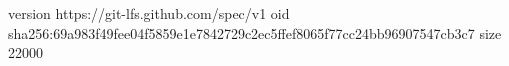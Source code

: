 version https://git-lfs.github.com/spec/v1
oid sha256:69a983f49fee04f5859e1e7842729c2ec5ffef8065f77cc24bb96907547cb3c7
size 22000
